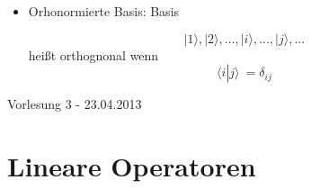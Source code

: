 \documentclass[10pt,article,colorback,accentcolor=tud9d]{scrartcl}
\begin{document}
\begin{itemize}
\begin{itemize}
\end{itemize}
\item Orhonormierte Basis: Basis
 
\begin{equation} \nonumber
{\left|\right.1\rangle ,\left|\right.2\rangle ,...,\left|\right.i\rangle ,...,\left|\right.j\rangle ,...}
\end{equation}
heißt orthognonal wenn
\begin{equation}
\langle i\left|\right. j\rangle  \ ={\delta}_{ij}
\end{equation}
 
\end{itemize}
\begin{flushright}Vorlesung 3 - 23.04.2013\end{flushright}
\section{Lineare Operatoren}
\end{document}
